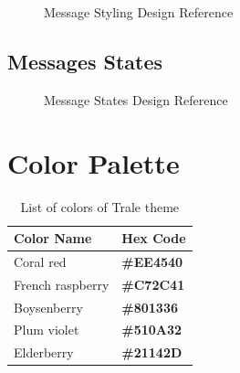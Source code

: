 \begin{figure}[ht]
    \caption{Message Styling Design Reference}
    \centering\def\svgwidth{15cm}\label{fig:figure2}
\end{figure}


\subsection{Messages States}\label{subsec:messages-states}
\begin{figure}[ht]
    \caption{Message States Design Reference}
    \centering\def\svgwidth{15cm}\label{fig:figure3}
\end{figure}

\section{Color Palette}\label{sec:color-palette}

\begin{table}[hb]
    \centering
    \begin{tabular}{|l|l|}
        \hline
        \textbf{Color Name} & \textbf{Hex Code}\\ \hline
        Coral red & \color[HTML]{EE4540}\textbf{\#EE4540} \\ \hline
        French raspberry & \color[HTML]{C72C41}\textbf{\#C72C41} \\ \hline
        Boysenberry & \color[HTML]{801336}\textbf{\#801336} \\ \hline
        Plum violet & \color[HTML]{510A32}\textbf{\#510A32} \\ \hline
        Elderberry & \color[HTML]{21142D}\textbf{\#21142D} \\ \hline
    \end{tabular}
    \caption{List of colors of Trale theme}
    \label{tab:colorTable}
\end{table}

